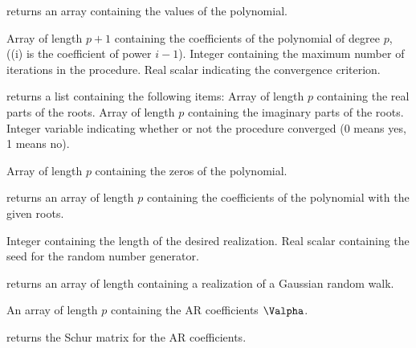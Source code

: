 \Sval
\Sitem{ }  returns an array containing the values 
of the polynomial.
%
%


\Sarg
{} Array of length $p+1$ containing the coefficients of the
polynomial of degree $p$, ({}(i) is the coefficient of power
$i-1$).
 Integer containing the maximum number of iterations in the
procedure.
 Real scalar indicating the convergence criterion.

\Sval
\Sitem{ }  returns a list containing the following 
items:
 Array of length $p$ containing the real parts of the roots.
 Array of length $p$ containing the imaginary parts of the
roots.
 Integer variable indicating whether or not the procedure
converged (0 means yes, 1 means no).
%
%


\Sarg
{} Array of length $p$ containing the zeros of the polynomial.

\Sval
\Sitem{ }  returns an array of length $p$ 
containing the coefficients of the polynomial with the given roots.
%
%


\Sarg
{} Integer containing the length of the desired realization.
 Real scalar containing the seed for the random number generator.

\Sval
\Sitem{ }  returns an array of length {} containing
a realization of a Gaussian random walk.
%
%


\Sarg
{} An array of length $p$ containing the AR coefficients 
$\Valpha$.

\Sval
\Sitem{ }  returns the Schur matrix for the AR coefficients.
%
%


